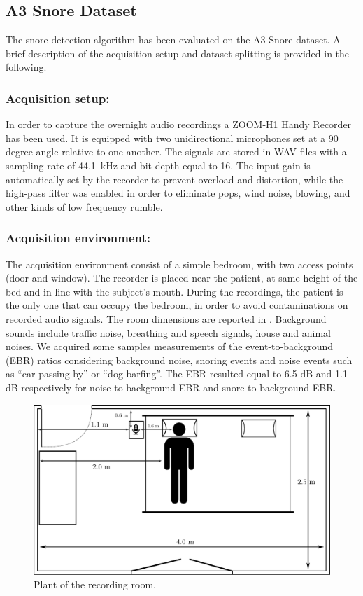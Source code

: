 \subsection{A3 Snore Dataset} 

The snore detection algorithm has been evaluated on the A3-Snore dataset. A brief description of the acquisition setup and dataset splitting is provided in the following.

\subsubsection{Acquisition setup:}
In order to capture the overnight audio recordings a ZOOM-H1 Handy Recorder has been used. It is equipped with two unidirectional microphones set at a 90 degree angle relative to one another. The signals are stored in WAV files with a sampling rate of 44.1\ kHz and bit depth equal to 16.
The input gain is automatically set by the recorder to prevent overload and distortion, while the high-pass filter was enabled in order to eliminate pops, wind noise, blowing, and other kinds of low frequency rumble.


\subsubsection{Acquisition environment:}
The acquisition environment consist of a simple bedroom, with two access points (door and window). The recorder is placed near the patient, at same height of the bed and in line with the subject's mouth. During the recordings, the patient is the only one that can occupy the bedroom, in order to avoid contaminations on recorded audio signals. The room dimensions are reported in .
Background sounds include traffic noise, breathing and speech signals, house and animal noises. We acquired some samples measurements of the event-to-background (EBR) ratios considering background noise, snoring events and noise events such as ``car passing by'' or ``dog barfing''. The EBR resulted equal to 6.5 dB and 1.1 dB respectively for noise to background EBR and snore to background EBR. 


\begin{figure}[t]
	\centering
	\includegraphics[width=0.6\columnwidth]{img/room.pdf}
	\caption{Plant of the recording room.} 
	\label{fig:room}
\end{figure}


